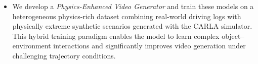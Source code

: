 \documentclass[runningheads]{llncs}
\begin{document}
\begin{itemize}

\item We develop a \textit{Physics-Enhanced Video Generator} and train these models on a heterogeneous physics-rich dataset combining real-world driving logs with physically extreme synthetic scenarios generated with the CARLA simulator. This hybrid training paradigm enables the model to learn complex object–environment interactions and significantly improves video generation under challenging trajectory conditions.




\end{itemize}



\end{document}
